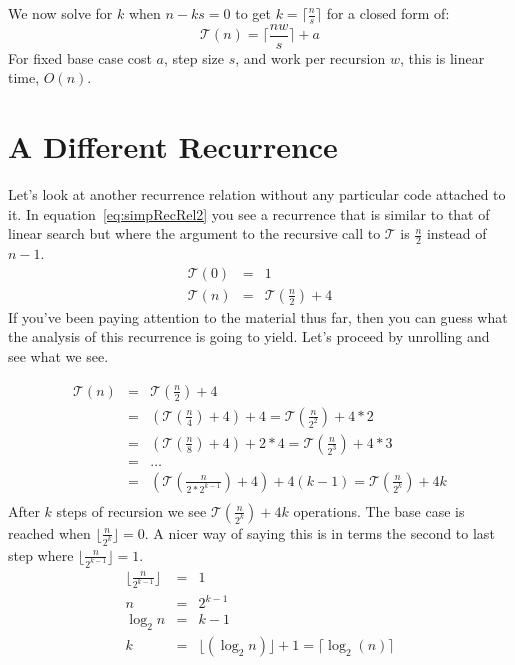 \documentclass[nobib]{tufte-handout}
\begin{document}
We now solve for $k$ when $n-ks=0$ to get $k = \lceil \frac{n}{s} \rceil$ for a closed form of:
\begin{equation}
    \mathcal{T}(n) = \lceil \frac{nw}{s} \rceil + a
\end{equation}
For fixed base case cost $a$, step size $s$, and work per recursion $w$, this is linear time, $O(n)$.

\section{A Different Recurrence}

Let's look at another recurrence relation without any particular code attached to it. In equation~\ref{eq:simpRecRel2} you see a recurrence that is similar to that of linear search but where the argument to the recursive call to $\mathcal{T}$ is $\frac{n}{2}$ instead of $n-1$.
\begin{equation}
  \begin{array}{rcl}
    \mathcal{T}(0) &=& 1 \\
    \mathcal{T}(n) &=& \mathcal{T}(\frac{n}{2}) + 4
  \end{array}
\label{eq:simpRecRel2}
\end{equation}
If you've been paying attention to the material thus far, then you can guess what the analysis of this recurrence is going to yield. Let's proceed by unrolling and see what we see.

\begin{equation*}
  \begin{array}{rcl}
    \mathcal{T}(n) &=& \mathcal{T}(\frac{n}{2}) + 4 \\
    &=& (\mathcal{T}(\frac{n}{4}) + 4 ) + 4 = \mathcal{T}(\frac{n}{2^2}) +  4*2 \\
    &=& (\mathcal{T}(\frac{n}{8}) + 4 ) + 2*4 = \mathcal{T}(\frac{n}{2^3}) +  4*3 \\
    &=& \ldots \\
    &=& (\mathcal{T}(\frac{n}{2*2^{k-1}} ) + 4) + 4(k-1) = \mathcal{T}(\frac{n}{2^k}) + 4k \\
  \end{array}
\end{equation*}
After $k$ steps of recursion we see $\mathcal{T}(\frac{n}{2^k}) + 4k$ operations. The base case is reached when $\lfloor \frac{n}{2^k} \rfloor = 0$. A nicer way of saying this is in terms the second to last step where $\lfloor \frac{n}{2^{k-1}} \rfloor = 1$.
\begin{equation}
  \begin{array}{rcl}
    \lfloor \frac{n}{2^{k-1}} \rfloor &=& 1  \\
    n &=& 2^{k-1} \\
    \log_2{n} &=& k-1 \\
    k &=& \lfloor (\log_2{n}) \rfloor + 1  = \lceil \log_2{(n)} \rceil \\
  \end{array}
\end{equation}
\end{document}
